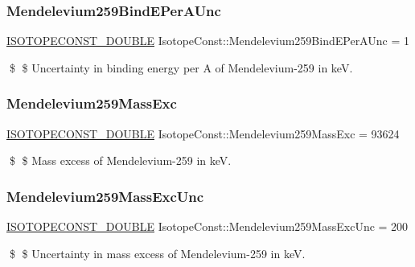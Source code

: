 \subsubsection{\texorpdfstring{Mendelevium259\+Bind\+E\+Per\+A\+Unc}{Mendelevium259BindEPerAUnc}}
{\footnotesize\ttfamily \mbox{\hyperlink{group___isotope_const-_macros_ga8f45a7272ce02c0b4c65c44636ed719a}{I\+S\+O\+T\+O\+P\+E\+C\+O\+N\+S\+T\+\_\+\+D\+O\+U\+B\+LE}} Isotope\+Const\+::\+Mendelevium259\+Bind\+E\+Per\+A\+Unc = 1}

\$ \$ Uncertainty in binding energy per A of Mendelevium-\/259 in keV. \mbox{\label{group___isotope_const-_mendelevium-_md259_ga340589f9d3e214319e43f64d32fa1cf9}} 
\subsubsection{\texorpdfstring{Mendelevium259\+Mass\+Exc}{Mendelevium259MassExc}}
{\footnotesize\ttfamily \mbox{\hyperlink{group___isotope_const-_macros_ga8f45a7272ce02c0b4c65c44636ed719a}{I\+S\+O\+T\+O\+P\+E\+C\+O\+N\+S\+T\+\_\+\+D\+O\+U\+B\+LE}} Isotope\+Const\+::\+Mendelevium259\+Mass\+Exc = 93624}

\$ \$ Mass excess of Mendelevium-\/259 in keV. \mbox{\label{group___isotope_const-_mendelevium-_md259_ga17acdc865a055e6cb41aa4e1a0b412d7}} 
\subsubsection{\texorpdfstring{Mendelevium259\+Mass\+Exc\+Unc}{Mendelevium259MassExcUnc}}
{\footnotesize\ttfamily \mbox{\hyperlink{group___isotope_const-_macros_ga8f45a7272ce02c0b4c65c44636ed719a}{I\+S\+O\+T\+O\+P\+E\+C\+O\+N\+S\+T\+\_\+\+D\+O\+U\+B\+LE}} Isotope\+Const\+::\+Mendelevium259\+Mass\+Exc\+Unc = 200}

\$ \$ Uncertainty in mass excess of Mendelevium-\/259 in keV. \mbox{\label{group___isotope_const-_mendelevium-_md259_ga16c987b5fd7914543766ed546d486164}} 
